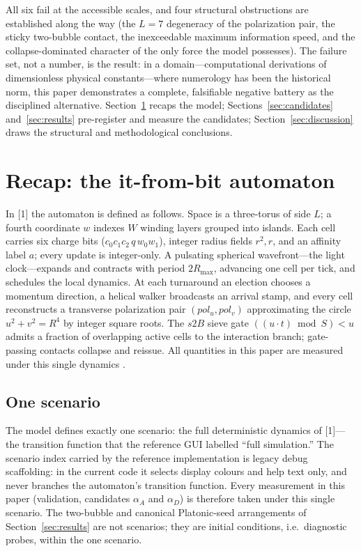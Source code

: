\documentclass[11pt,a4paper]{article}
\begin{document}
All six fail at the accessible scales, and four structural obstructions are
established along the way (the $L=7$ degeneracy of the polarization pair, the
sticky two-bubble contact, the inexceedable maximum information speed, and
the collapse-dominated character of the only force the model possesses). The
failure set, not a number, is the result: in a domain---computational
derivations of dimensionless physical constants---where numerology has been
the historical norm, this paper demonstrates a complete, falsifiable negative
battery as the disciplined alternative. Section~\ref{sec:recap} recaps the
model; Sections~\ref{sec:candidates} and~\ref{sec:results} pre-register and
measure the candidates; Section~\ref{sec:discussion} draws the structural and
methodological conclusions.

\section{Recap: the it-from-bit automaton}
\label{sec:recap}

In [1] the automaton is defined as follows. Space is a three-torus of side
$L$; a fourth coordinate $w$ indexes $W$ winding layers grouped into islands.
Each cell carries six charge bits ($c_0c_1c_2\,q\,w_0w_1$), integer radius
fields $r^2,r$, and an affinity label $a$; every update is integer-only. A
pulsating spherical wavefront---the light clock---expands and contracts with
period $2R_{\max}$, advancing one cell per tick, and schedules the local
dynamics. At each turnaround an election chooses a momentum direction, a
helical walker broadcasts an arrival stamp, and every cell reconstructs a
transverse polarization pair $(pol_u,pol_v)$ approximating the circle
$u^2+v^2=R^4$ by integer square roots. The $s2B$ sieve gate
$((u\cdot t)\bmod S)<u$ admits a fraction of overlapping active cells to the
interaction branch; gate-passing contacts collapse and reissue. All
quantities in this paper are measured under this single dynamics
\cite{itfrombit}.

\subsection{One scenario}
\label{sec:onescenario}

The model defines exactly one scenario: the full deterministic dynamics of
[1]---the transition function that the reference GUI labelled ``full
simulation.'' The scenario index carried by the reference implementation is
legacy debug scaffolding: in the current code it selects display colours and
help text only, and never branches the automaton's transition function. Every
measurement in this paper (validation, candidates $\alpha_A$ and $\alpha_D$)
is therefore taken under this single scenario. The two-bubble and canonical
Platonic-seed arrangements of Section~\ref{sec:results} are not scenarios;
they are initial conditions, i.e.\ diagnostic probes, within the one
scenario.
\end{document}

